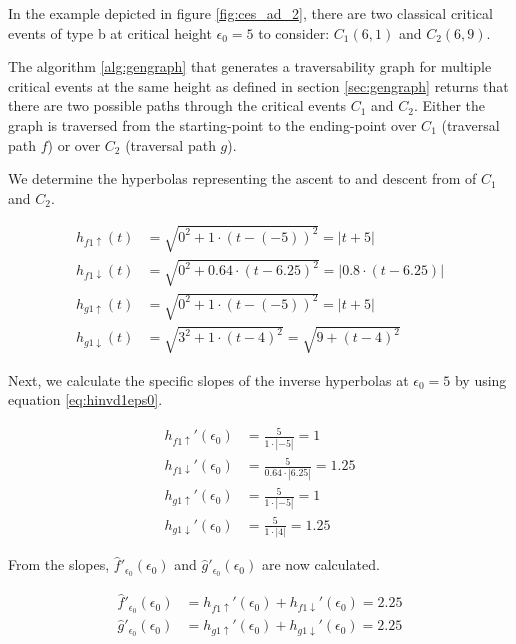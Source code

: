 In the example depicted in figure \ref{fig:ces_ad_2}, there are two classical critical events of type b at critical height $\epsilon_0 = 5$ to consider: $C_1(6, 1)$ and $C_2(6, 9)$.

The algorithm \ref{alg:gengraph} that generates a traversability graph for multiple critical events at the same height as defined in section \ref{sec:gengraph} returns that there are two possible paths through the critical events $C_1$ and $C_2$. Either the graph is traversed from the starting-point to the ending-point over $C_1$ (traversal path $f$) or over $C_2$ (traversal path $g$).

We determine the hyperbolas representing the ascent to and descent from of $C_1$ and $C_2$.

\begin{align*}
	h_{f1\uparrow}(t) &= \sqrt{0^2 + 1\cdot(t - (-5))^2} = \left| t + 5 \right|\\
	h_{f1\downarrow}(t) &= \sqrt{0^2 + 0.64\cdot(t - 6.25)^2} = \left| 0.8\cdot(t - 6.25) \right|\\
	h_{g1\uparrow}(t) &= \sqrt{0^2 + 1\cdot(t - (-5))^2} = \left| t + 5 \right|\\
	h_{g1\downarrow}(t) &= \sqrt{3^2 + 1\cdot(t - 4)^2} = \sqrt{9 + (t - 4)^2}
\end{align*}

Next, we calculate the specific slopes of the inverse hyperbolas at $\epsilon_0 = 5$ by using equation \ref{eq:hinvd1eps0}.

\begin{align*}
	h_{f1\uparrow}'(\epsilon_0) &= \frac{5}{1\cdot\left|-5\right|} = 1\\
	h_{f1\downarrow}'(\epsilon_0) &= \frac{5}{0.64\cdot\left|6.25\right|} = 1.25\\
	h_{g1\uparrow}'(\epsilon_0) &= \frac{5}{1\cdot\left|-5\right|} = 1\\
	h_{g1\downarrow}'(\epsilon_0) &= \frac{5}{1\cdot\left|4\right|} = 1.25 
\end{align*}

From the slopes, $\hat{f}'_{\epsilon_0}(\epsilon_0)$ and $\hat{g}'_{\epsilon_0}(\epsilon_0)$ are now calculated.

\begin{align*}
	\hat{f}'_{\epsilon_0}(\epsilon_0) &= h_{f1\uparrow}'(\epsilon_0) + h_{f1\downarrow}'(\epsilon_0) = 2.25\\
	\hat{g}'_{\epsilon_0}(\epsilon_0) &= h_{g1\uparrow}'(\epsilon_0) + h_{g1\downarrow}'(\epsilon_0) = 2.25\\
\end{align*}

